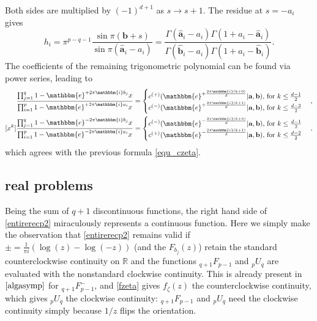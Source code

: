 \documentclass[12pt]{article}
\newcommand{\ee}[0] {\mathbbm{e}}
\newcommand{\ii}[0] {\mathbbm{i}}
\numberwithin{equation}{section}
\newcommand{\bfa}[0] {\mathbf{a}}
\newcommand{\bfb}[0] {\mathbf{b}}
\begin{document}
Both sides are multiplied by $(-1)^{d+1}$ as $s \to s+1$. The residue at $s=-a_i$ gives
\begin{equation*}
h_i = \pi^{p-q-1} \frac{\sin \pi(\bfb + s) }{\sin \pi(\hat{\bfa}_i - a_i) } = \frac{\Gamma(\hat{\bfa}_i- a_i)\Gamma(1+ a_i-\hat{\bfa}_i)}{\Gamma(\hat{\bfb}_i- a_i)\Gamma(1+ a_i-\hat{\bfb}_i)}\text{.}
\end{equation*}
The coefficients of the remaining trigonometric polynomial can be found via power series, leading to
\begin{align*}
[x^k] \frac{\prod_{j=1}^{q} {1- \ee^{+2\pi \ii b_j}x}}{\prod_{i=1}^{p} {1- \ee^{+2\pi \ii a_i} x}} &= \begin{cases} c^{(+)}(\ee^{+\frac{2\pi \ii (k+0)}{d}} | \bfa, \bfb)\text{, for } k \le \frac{d-1}{2} \\
c^{(-)}(\ee^{+\frac{2\pi \ii (k+1)}{d}} | \bfa, \bfb)\text{, for } k \le \frac{d-2}{2}
\end{cases}\text{,}\\
[x^k] \frac{\prod_{j=1}^{q} {1- \ee^{-2\pi \ii b_j}x}}{\prod_{i=1}^{p} {1- \ee^{-2\pi \ii a_i} x}} &= \begin{cases} c^{(-)}(\ee^{-\frac{2\pi \ii (k+0)}{d}} | \bfa, \bfb)\text{, for } k \le \frac{d-1}{2} \\
c^{(+)}(\ee^{-\frac{2\pi \ii (k+1)}{d}} | \bfa, \bfb)\text{, for } k \le \frac{d-2}{2}
\end{cases}\text{,}
\end{align*}
which agrees with the previous formula \eqref{equ_czeta}.


\subsection{real problems}
Being the sum of $q+1$ discontinuous functions, the right hand side of \eqref{entirerecp2} miraculously represents a continuous function. Here we simply make the observation that \eqref{entirerecp2} remains valid if $\pm = \tfrac{1}{\pi i}(\log(z)-\log(-z))$ (and the $F_{b_j}(z)$) retain the standard counterclockwise continuity on $\mathbb{R}$ and the functions ${}_{q+1}F_{p-1}$ and ${}_p U_{q}$ are evaluated with the nonstandard clockwise continuity. This is already present in $\eqref{algasymp}$ for ${}_{q+1}F_{p-1}^{-}$, and \eqref{fzeta} gives $f_{\zeta}(z)$ the counterclockwise continuity, which gives ${}_p U_q$ the clockwise continuity: ${}_{q+1}F_{p-1}$ and ${}_p U_{q}$ need the clockwise continuity simply because $1/z$ flips the orientation.
\end{document}
